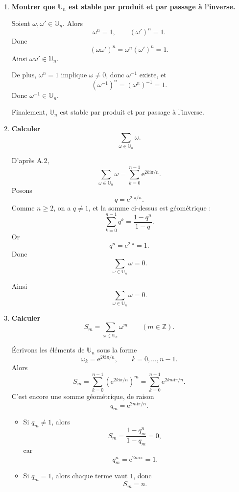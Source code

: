 \documentclass[11pt,a4paper]{article}
\newcommand{\U}{\mathbb{U}}
\newcommand{\ii}{\mathrm{i}}
\newcommand{\e}{\mathrm{e}}
\begin{document}
\begin{enumerate}[label=\textbf{A.\arabic*.}]
    Ainsi
    \[
    E\subset \U_n.
    \]

    Par double inclusion,
    \[
    \boxed{\U_n=\left\{\e^{2\ii k\pi/n}\mid k\in\llbracket 0,n-1\rrbracket\right\}.}
    \]

    \item \textbf{Montrer que \(\U_n\) est stable par produit et par passage à l’inverse.}

    Soient \(\omega,\omega'\in\U_n\). Alors
    \[
    \omega^n=1,\qquad (\omega')^n=1.
    \]
    Donc
    \[
    (\omega\omega')^n=\omega^n(\omega')^n=1.
    \]
    Ainsi \(\omega\omega'\in\U_n\).

    De plus, \(\omega^n=1\) implique \(\omega\neq 0\), donc \(\omega^{-1}\) existe, et
    \[
    (\omega^{-1})^n=(\omega^n)^{-1}=1.
    \]
    Donc \(\omega^{-1}\in\U_n\).

    Finalement, \(\U_n\) est stable par produit et par passage à l’inverse.

    \item \textbf{Calculer
    \[
    \sum_{\omega\in\U_n}\omega.
    \]}

    D’après A.2,
    \[
    \sum_{\omega\in\U_n}\omega=\sum_{k=0}^{n-1}\e^{2k\ii\pi/n}.
    \]
    Posons
    \[
    q=\e^{2\ii\pi/n}.
    \]
    Comme \(n\ge 2\), on a \(q\neq 1\), et la somme ci-dessus est géométrique :
    \[
    \sum_{k=0}^{n-1}q^k=\frac{1-q^n}{1-q}.
    \]
    Or
    \[
    q^n=\e^{2\ii\pi}=1.
    \]
    Donc
    \[
    \sum_{\omega\in\U_n}\omega=0.
    \]

    Ainsi
    \[
    \boxed{\sum_{\omega\in\U_n}\omega=0.}
    \]

    \item \textbf{Calculer
    \[
    S_m=\sum_{\omega\in\U_n}\omega^m
    \qquad (m\in\mathbb{Z}).
    \]}

    Écrivons les éléments de \(\U_n\) sous la forme
    \[
    \omega_k=\e^{2k\ii\pi/n},\qquad k=0,\dots,n-1.
    \]
    Alors
    \[
    S_m=\sum_{k=0}^{n-1}\left(\e^{2k\ii\pi/n}\right)^m
    =\sum_{k=0}^{n-1}\e^{2km\ii\pi/n}.
    \]
    C’est encore une somme géométrique, de raison
    \[
    q_m=\e^{2m\ii\pi/n}.
    \]

    \begin{itemize}
        \item Si \(q_m\neq 1\), alors
        \[
        S_m=\frac{1-q_m^n}{1-q_m}=0,
        \]
        car
        \[
        q_m^n=\e^{2m\ii\pi}=1.
        \]

        \item Si \(q_m=1\), alors chaque terme vaut \(1\), donc
        \[
        S_m=n.
        \]
    \end{itemize}


\end{enumerate}
\end{document}
